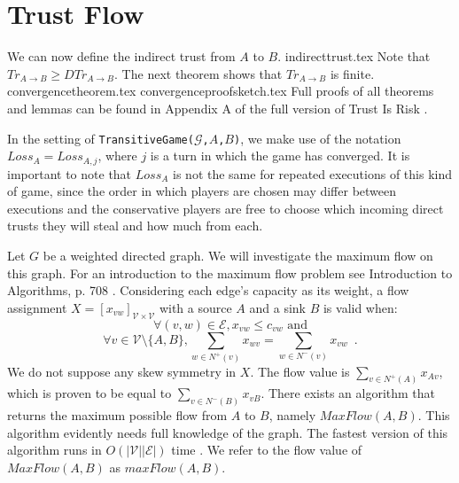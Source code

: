 \section{Trust Flow}
  We can now define the indirect trust from $A$ to $B$.
  {indirecttrust.tex}
  \noindent Note that $Tr_{A \rightarrow B} \geq DTr_{A \rightarrow B}$. The next theorem shows that $Tr_{A \rightarrow B}$ is
  finite.
  {convergencetheorem.tex}
  {convergenceproofsketch.tex}
  Full proofs of all theorems and lemmas can be found in Appendix A of the full version of Trust Is Risk \cite{trustisrisk}.

  In the setting of \texttt{TransitiveGame(}$\mathcal{G}$\texttt{,}$A$\texttt{,}$B$\texttt{)}, we make use of the notation
  $Loss_A = Loss_{A, j}$, where $j$ is a turn in which the game has converged. It is important to note that $Loss_A$ is not
  the same for repeated executions of this kind of game, since the order in which players are chosen may differ between
  executions and the conservative players are free to choose which incoming direct trusts they will steal and how much from
  each.

  Let $G$ be a weighted directed graph. We will investigate the maximum flow on this graph. For an introduction to the maximum
  flow problem see Introduction to Algorithms, p. 708 \cite{clrs}. Considering each edge's capacity as its weight, a flow
  assignment $X = [x_{vw}]_{\mathcal{V} \times \mathcal{V}}$ with a source $A$ and a sink $B$ is valid when:
  \begin{equation}
  \label{flow1}
    \forall (v, w) \in \mathcal{E}, x_{vw} \leq c_{vw} \mbox{ and}
  \end{equation}
  \begin{equation}
  \label{flow2}
    \forall v \in \mathcal{V} \setminus \{A,B\}, \sum\limits_{w \in N^{+}(v)}x_{wv} = \sum\limits_{w \in N^{-}(v)}x_{vw}
    \enspace.
  \end{equation}
  We do not suppose any skew symmetry in $X$. The flow value is $\sum\limits_{v \in N^{+}\left(A\right)}x_{Av}$, which is
  proven to be equal to $\sum\limits_{v \in N^{-}\left(B\right)}x_{vB}$. There exists an algorithm that returns the maximum
  possible flow from $A$ to $B$, namely $MaxFlow\left(A, B\right)$. This algorithm evidently needs full knowledge of the
  graph. The fastest version of this algorithm runs in $O\left(|\mathcal{V}||\mathcal{E}|\right)$ time \cite{maxflownm}. We
  refer to the flow value of $MaxFlow\left(A, B\right)$ as $maxFlow\left(A, B\right)$.

